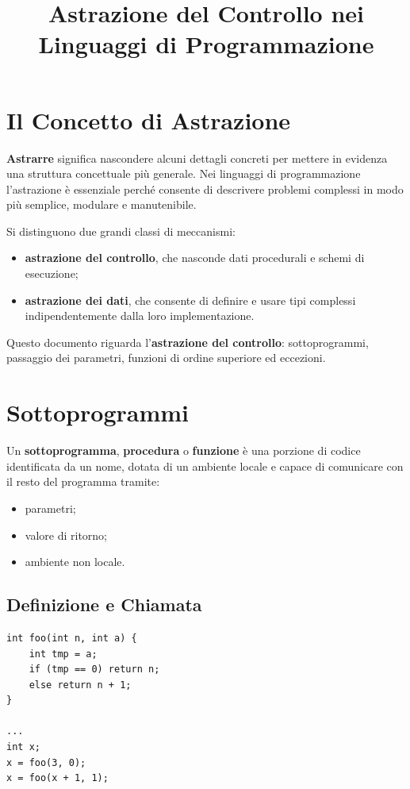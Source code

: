 \documentclass{article}
\title{Astrazione del Controllo nei Linguaggi di Programmazione}
\author{}
\date{}
\begin{document}
\maketitle

\section{Il Concetto di Astrazione}

\textbf{Astrarre} significa nascondere alcuni dettagli concreti per mettere in evidenza una struttura concettuale più generale. Nei linguaggi di programmazione l'astrazione è essenziale perché consente di descrivere problemi complessi in modo più semplice, modulare e manutenibile.

Si distinguono due grandi classi di meccanismi:
\begin{itemize}
  \item \textbf{astrazione del controllo}, che nasconde dati procedurali e schemi di esecuzione;
  \item \textbf{astrazione dei dati}, che consente di definire e usare tipi complessi indipendentemente dalla loro implementazione.
\end{itemize}

Questo documento riguarda l'\textbf{astrazione del controllo}: sottoprogrammi, passaggio dei parametri, funzioni di ordine superiore ed eccezioni.

\section{Sottoprogrammi}

Un \textbf{sottoprogramma}, \textbf{procedura} o \textbf{funzione} è una porzione di codice identificata da un nome, dotata di un ambiente locale e capace di comunicare con il resto del programma tramite:
\begin{itemize}
  \item parametri;
  \item valore di ritorno;
  \item ambiente non locale.
\end{itemize}

\subsection{Definizione e Chiamata}

\begin{lstlisting}
int foo(int n, int a) {
    int tmp = a;
    if (tmp == 0) return n;
    else return n + 1;
}

...
int x;
x = foo(3, 0);
x = foo(x + 1, 1);
\end{lstlisting}
\end{document}

